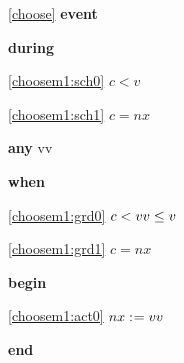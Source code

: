 \noindent \ref{choose}  \textbf{event}
\begin{block}
  \item   \textbf{during}
  \begin{block}
  \item[ \eqref{choosem1:sch0} ]{$c < v$} %
  \item[ \eqref{choosem1:sch1} ]{$c = nx$} %
  \end{block}
  \item   \textbf{any} vv
  \item   \textbf{when}
  \begin{block}
  \item[ \eqref{choosem1:grd0} ]{$c < vv \le v$} %
  \item[ \eqref{choosem1:grd1} ]{$c = nx$} %
  \end{block}
  \item   \textbf{begin}
  \begin{block}
  \item[ \eqref{choosem1:act0} ]{$nx \mathrel{:\mkern1mu=} vv$} %
  \end{block}
  \item   \textbf{end} \\
\end{block}

